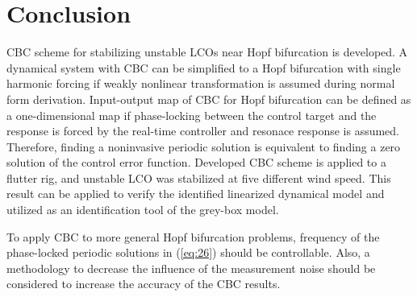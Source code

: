 \documentclass[openacc]{rsproca_new}%
\newcommand{\Eref}[1]{(\ref{#1})}
\begin{document}
\section{Conclusion}
CBC scheme for stabilizing unstable LCOs near Hopf bifurcation is developed. A dynamical system with CBC can be simplified to a Hopf bifurcation with single harmonic forcing if weakly nonlinear transformation is assumed during normal form derivation. Input-output map of CBC for Hopf bifurcation can be defined as a one-dimensional map if phase-locking between the control target and the response is forced by the real-time controller and resonace response is assumed. Therefore, finding a noninvasive periodic solution is equivalent to finding a zero solution of the control error function. Developed CBC scheme is applied to a flutter rig, and unstable LCO was stabilized at five different wind speed. This result can be applied to verify the identified linearized dynamical model and utilized as an identification tool of the grey-box model.

To apply CBC to more general Hopf bifurcation problems, frequency of the phase-locked periodic solutions in \Eref{eq:26} should be controllable. Also, a methodology to decrease the influence of the measurement noise should be considered to increase the accuracy of the CBC results. \vskip6pt


\enlargethispage{20pt}





\end{document}
